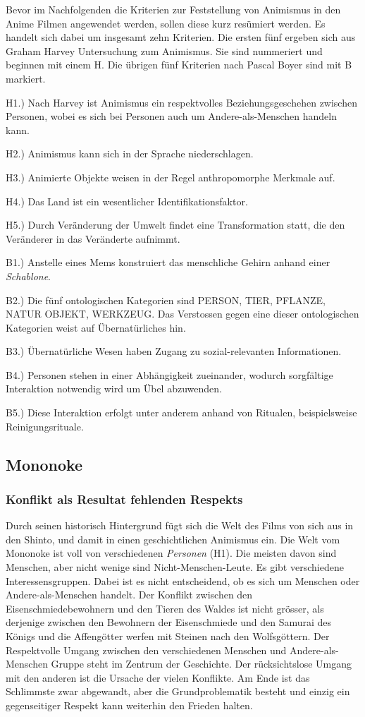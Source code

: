 Bevor im Nachfolgenden die Kriterien zur Feststellung von Animismus in den Anime Filmen angewendet werden, sollen diese kurz resümiert werden. Es handelt sich dabei um insgesamt zehn Kriterien. Die ersten fünf ergeben sich aus Graham Harvey Untersuchung zum Animismus. Sie sind nummeriert und beginnen mit einem H. Die übrigen fünf Kriterien nach Pascal Boyer sind mit B markiert.

H1.) Nach Harvey ist Animismus ein respektvolles Beziehungsgeschehen zwischen Personen, wobei es sich bei Personen auch um Andere-als-Menschen handeln kann.

H2.) Animismus kann sich in der Sprache niederschlagen.

H3.) Animierte Objekte weisen in der Regel anthropomorphe Merkmale auf.

H4.) Das Land ist ein wesentlicher Identifikationsfaktor.

H5.) Durch Veränderung der Umwelt findet eine Transformation statt, die den Veränderer in das Veränderte aufnimmt.

B1.) Anstelle eines Mems konstruiert das menschliche Gehirn anhand einer \emph{Schablone}.

B2.) Die fünf ontologischen Kategorien sind PERSON, TIER, PFLANZE, NATUR OBJEKT, WERKZEUG. Das Verstossen gegen eine dieser ontologischen Kategorien weist auf Übernatürliches hin.

B3.) Übernatürliche Wesen haben Zugang zu sozial-relevanten Informationen. 

B4.) Personen stehen in einer Abhängigkeit zueinander, wodurch sorgfältige Interaktion notwendig wird um Übel abzuwenden.

B5.) Diese Interaktion erfolgt unter anderem anhand von Ritualen, beispielsweise Reinigungsrituale.

\subsection{Mononoke} 
\subsubsection{Konflikt als Resultat fehlenden Respekts} 
Durch seinen historisch Hintergrund fügt sich die Welt des Films von sich aus in den Shinto, und damit in einen geschichtlichen Animismus ein. Die Welt vom Mononoke ist voll von verschiedenen \emph{Personen} (H1). Die meisten davon sind Menschen, aber nicht wenige sind Nicht-Menschen-Leute. Es gibt verschiedene Interessensgruppen. Dabei ist es nicht entscheidend, ob es sich um Menschen oder Andere-als-Menschen handelt. Der Konflikt zwischen den Eisenschmiedebewohnern und den Tieren des Waldes ist nicht grösser, als derjenige zwischen den Bewohnern der Eisenschmiede und den Samurai des Königs und die Affengötter werfen mit Steinen nach den Wolfsgöttern. Der Respektvolle Umgang zwischen den verschiedenen Menschen und Andere-als-Menschen Gruppe steht im Zentrum der Geschichte. Der rücksichtslose Umgang mit den anderen ist die Ursache der vielen Konflikte. Am Ende ist das Schlimmste zwar abgewandt, aber die Grundproblematik besteht und einzig ein gegenseitiger Respekt kann weiterhin den Frieden halten. 
 
